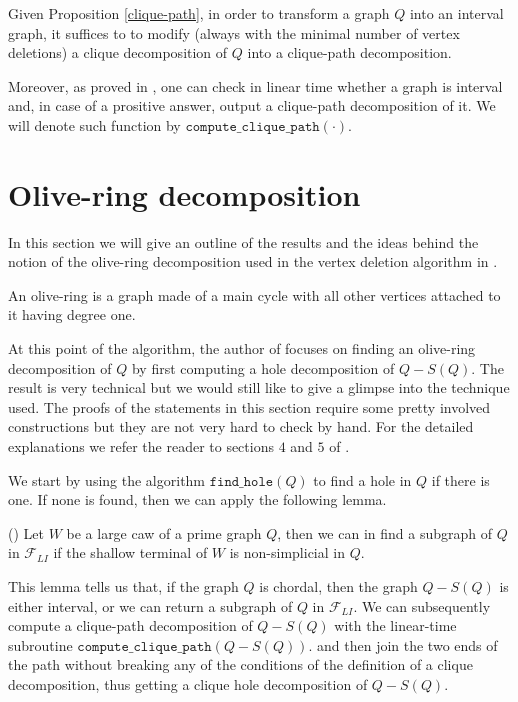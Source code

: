 \documentclass{article}
\begin{document}
    Given Proposition \ref{clique-path},
    in order to transform
    a graph $Q$ into an
    interval graph, it suffices
    to to modify
    (always with the minimal
    number of vertex deletions)
    a clique decomposition of
    $Q$ into a clique-path decomposition.
    
    Moreover, as proved in \cite{inter-path},
    one can check in linear time whether
    a graph is interval and, in case of 
    a prositive answer, output
    a clique-path decomposition of it.
    We will denote such function by
    $\texttt{compute\_clique\_path}\left(\cdot\right)$.

    \section{Olive-ring decomposition}

    In this section we will give
    an outline of the results 
    and the ideas behind the 
    notion of the olive-ring
    decomposition used in the
    vertex deletion algorithm
    in \cite{main}.

    An olive-ring is a
    graph made of a main cycle
    with all other vertices
    attached to it having 
    degree one.

    At this point of 
    the algorithm,
    the author of \cite{main} focuses
    on finding an olive-ring
    decomposition of $Q$
    by first computing
    a hole
    decomposition of $Q - S\left(Q\right)$.
    The result is very technical
    but we would still like
    to give a glimpse into
    the technique used.
    The proofs of the
    statements in this
    section require
    some pretty
    involved constructions
    but they are not
    very hard to check
    by hand.
    For the detailed
    explanations we
    refer the reader to
    sections $4$ and $5$ 
    of \cite{main}.
    
    We start by using the
    algorithm $\texttt{find\_hole}\left(Q\right)$
    to find a hole in $Q$ if
    there is one.
    If none is found, then we
    can apply the following lemma.

    \begin{lemma} (\cite{main}) \label{large caw lemma}
        Let $W$ be a large caw
        of a prime graph $Q$, 
        then we can in find
        a subgraph of $Q$ 
        in $\mathcal{F}_{LI}$ 
        if the shallow terminal of $W$
        is non-simplicial in $Q$.
    \end{lemma}

    This lemma tells us 
    that, if the graph $Q$
    is chordal, then
    the graph $Q - S\left(Q\right)$ 
    is either interval,
    or we can return a
    subgraph of $Q$ in $\mathcal{F}_{LI}$.
    We can subsequently
    compute a clique-path 
    decomposition of $Q - S\left(Q\right)$ 
    with the linear-time
    subroutine $\texttt{compute\_clique\_path}\left(Q - S\left(Q\right)\right)$.
    and then join the two ends
    of the path without
    breaking any of the 
    conditions of
    the definition
    of a clique decomposition,
    thus getting a
    clique hole decomposition
    of $Q - S\left(Q\right)$.
   
\end{document}
